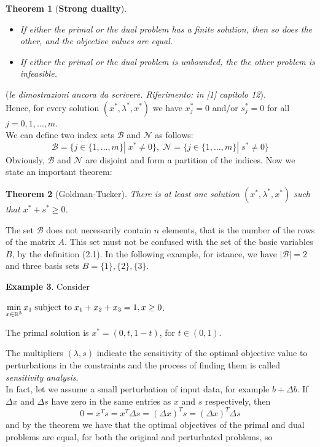 \documentclass[a4paper,10 pt,titlepage,twoside]{book}
\theoremstyle{plain}
\newtheorem{thm}{Theorem}[chapter]
\theoremstyle{definition}
\newtheorem{ex}[thm]{Example}
\theoremstyle{remark}
\begin{document}
\begin{thm}[\textbf{Strong duality}] \
\begin{itemize}
\item If either the primal or the dual problem has a finite solution, then so does the other, and the objective values are equal.
\item If either the primal or the dual problem is unbounded, the the other problem is infeasible.
\end{itemize}
\end{thm}
(\textit{le dimostrazioni ancora da scrivere. Riferimento: in [1] capitolo 12}).\\
Hence, for every solution $(x^{*}, \lambda^{*}, x^{*})$ we have $x_{j}^{*}= 0$ and/or $s_{j}^{*}= 0$ for all $j=0,1,\dots,m$.\\
We can define two index sets $\mathcal{B}$ and $\mathcal{N}$ as follows:
\begin{equation}
\mathcal{B} =\{j\in\{1,\dots,m\}|\; x^{*} \not= 0\}, \;
\mathcal{N} =\{j\in\{1,\dots,m\}|\; s^{*} \not= 0\}
\end{equation}  
Obviously, $\mathcal{B}$ and $\mathcal{N}$ are disjoint and form a partition of the indices. Now we state an important theorem:
\begin{thm}[Goldman-Tucker]
	There is at least one solution $(x^{*}, \lambda^{*}, x^{*})$ such that $x^{*}+s^{*}\geq0$.
\end{thm}
The set $\mathcal{B}$ does not necessarily contain $n$ elements, that is the number of the rows of the matrix $A$. This set must not be confused with the set of the basic variables $B$, by the definition (2.1). In the following example, for istance, we have $|\mathcal{B}|= 2$ and three basis sets $B = \{1\}, \{2\}, \{3\}$.
\begin{ex}
Consider
\begin{center} $\min\limits_{x\in\mathbb{R}^{3}} x_{1} \text{\;subject to\;} x_{1}+x_{2}+x_{3} = 1, x\geq 0$.\end{center}
The primal solution is $x^{*}=(0, t, 1-t)$, for $t\in(0,1)$. 	
\end{ex} 

The multipliers $(\lambda,s)$ indicate the sensitivity of the optimal objective value  to perturbations in the constraints and the process of finding them is called \textit{sensitivity analysis}. \\ In fact, let we assume a small perturbation of input data, for example $b + \Delta b$. If $\Delta x$ and $\Delta s$ have zero in the same entries as $x$ and $s$ respectively, then
\begin{equation*}
0=x^{T}s=x^{T}\Delta s= \left( \Delta x\right)^{T}s=\left( \Delta x\right)^{T}\Delta s
\end{equation*}
and by the theorem we have that the optimal objectives of the primal and dual problems are equal, for both the original and perturbated problems, so
\end{document}
